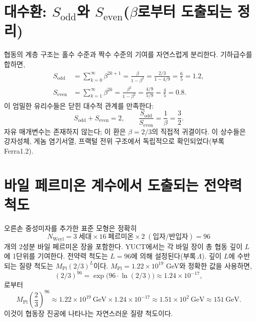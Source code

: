 \documentclass[12pt,a4paper]{article}
\begin{document}
	\section{대수환: \(S_{\mathrm{odd}}\)와 \(S_{\mathrm{even}}\)(\(\beta\)로부터 도출되는 정리)}
	\label{sec:algebraic-loop}
	
	협동의 계층 구조는 홀수 수준과 짝수 수준의 기여를 자연스럽게 분리한다. 기하급수를 합하면,
	\begin{align}
		S_{\mathrm{odd}} &= \sum_{k=0}^{\infty} \beta^{2k+1} = \frac{\beta}{1-\beta^{2}} = \frac{2/3}{1 - 4/9} = \frac{6}{5} = 1.2, \label{eq:sodd}\\
		S_{\mathrm{even}} &= \sum_{k=1}^{\infty} \beta^{2k} = \frac{\beta^{2}}{1-\beta^{2}} = \frac{4/9}{5/9} = \frac{4}{5} = 0.8. \label{eq:seven}
	\end{align}
	이 엄밀한 유리수들은 닫힌 대수적 관계를 만족한다:
	\begin{equation}
		\boxed{S_{\mathrm{odd}} + S_{\mathrm{even}} = 2, \qquad \frac{S_{\mathrm{odd}}}{S_{\mathrm{even}}} = \frac{1}{\beta} = \frac{3}{2}}.
		\label{eq:algebraic-loop}
	\end{equation}
	자유 매개변수는 존재하지 않는다; 이 환은 \(\beta = 2/3\)의 직접적 귀결이다. 이 상수들은 강자성체, 게놈 염기서열, 프랙털 전위 구조에서 독립적으로 확인되었다(부록 Ferra1.2).
	
	\section{바일 페르미온 계수에서 도출되는 전약력 척도}
	
	오른손 중성미자를 추가한 표준 모형은 정확히
	\begin{equation}
		N_{\mathrm{Weyl}} = 3\;\text{세대} \times 16\;\text{페르미온} \times 2\;(\text{입자/반입자}) = 96
	\end{equation}
	개의 2성분 바일 페르미온 장을 포함한다. YUCT에서는 각 바일 장이 총 협동 깊이 \(L\)에 1단위를 기여한다. 전약력 척도는 \(L = 96\)에 의해 설정된다(부록 \(\Lambda\)). 깊이 \(L\)에 수반되는 질량 척도는 \(M_{\mathrm{Pl}} (2/3)^{L}\)이다. \(M_{\mathrm{Pl}} = 1.22 \times 10^{19}\) GeV와 정확한 값을 사용하면,
	\begin{equation}
		(2/3)^{96} = \exp\bigl(96 \cdot \ln(2/3)\bigr) \approx 1.24 \times 10^{-17},
	\end{equation}
	로부터
	\begin{equation}
		M_{\mathrm{Pl}} \left(\frac{2}{3}\right)^{96} \approx 1.22 \times 10^{19}\ \mathrm{GeV} \times 1.24 \times 10^{-17} \approx 1.51 \times 10^{2}\ \mathrm{GeV} \approx 151\ \mathrm{GeV}.
	\end{equation}
	이것이 협동장 진공에 나타나는 자연스러운 질량 척도이다.
	
\end{document}
